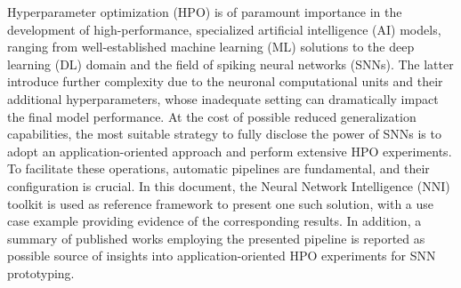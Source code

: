 Hyperparameter optimization (HPO) is of paramount importance in the development of high-performance, specialized artificial intelligence (AI) models, ranging from well-established machine learning (ML) solutions to the deep learning (DL) domain and the field of spiking neural networks (SNNs).
The latter introduce further complexity due to the neuronal computational units and their additional hyperparameters, whose inadequate setting can dramatically impact the final model performance.
At the cost of possible reduced generalization capabilities, the most suitable strategy to fully disclose the power of SNNs is to adopt an application-oriented approach and perform extensive HPO experiments.
To facilitate these operations, automatic pipelines are fundamental, and their configuration is crucial.
In this document, the Neural Network Intelligence (NNI) toolkit is used as reference framework to present one such solution, with a use case example providing evidence of the corresponding results. In addition, a summary of published works employing the presented pipeline is reported as possible source of insights into application-oriented HPO experiments for SNN prototyping.